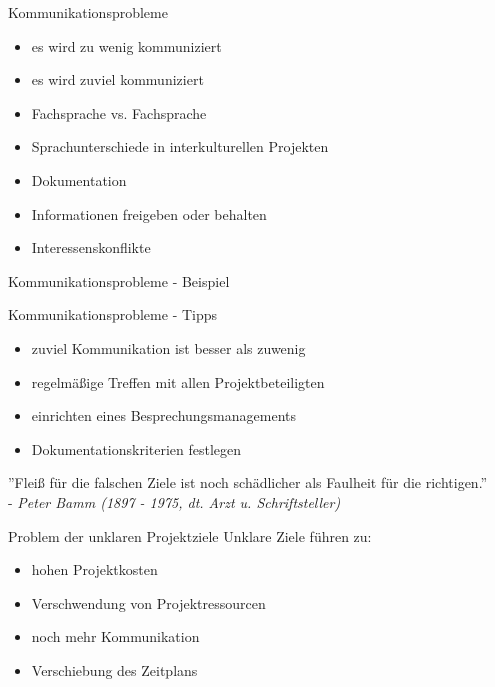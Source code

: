 \documentclass[12pt]{beamer}
\begin{document}
	\begin{frame}{Kommunikationsprobleme}
		\begin{itemize}
			\item{es wird zu wenig kommuniziert}
			\item{es wird zuviel kommuniziert}
			\item{Fachsprache vs. Fachsprache}
			\item{Sprachunterschiede in interkulturellen Projekten}
			\item{Dokumentation}
			\item{Informationen freigeben oder behalten}
			\item{Interessenskonflikte}
		\end{itemize}
	\end{frame}
	
	\begin{frame}{Kommunikationsprobleme - Beispiel}
		
	\end{frame}
	
	\begin{frame}{Kommunikationsprobleme - Tipps}
		\begin{itemize}
			\item{zuviel Kommunikation ist besser als zuwenig}
			\item{regelmäßige Treffen mit allen Projektbeteiligten}
			\item{einrichten eines Besprechungsmanagements}
			\item{Dokumentationskriterien festlegen}
		\end{itemize}
	\end{frame}

	\thispagestyle{empty}
	\begin{frame}
		''Fleiß für die falschen Ziele ist noch schädlicher als Faulheit für die richtigen.'' \\
		- \textit{Peter Bamm (1897 - 1975, dt. Arzt u. Schriftsteller)}
	\end{frame}

	
	\begin{frame}{Problem der unklaren Projektziele}
		Unklare Ziele führen zu:
		\begin{itemize}
			\item{hohen Projektkosten}
			\item{Verschwendung von Projektressourcen}
			\item{noch mehr Kommunikation}
			\item{Verschiebung des Zeitplans}
		\end{itemize}

	\end{frame}
\end{document}
